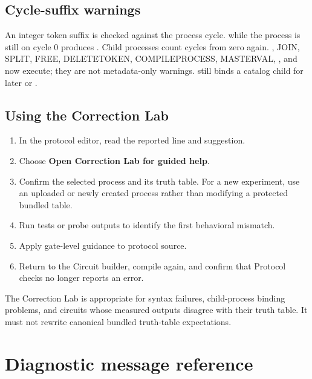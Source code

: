 \subsection{Cycle-suffix warnings}

An integer token suffix is checked against the process cycle.
 while the process is still on cycle 0 produces
. Child processes count cycles from zero again.
, JOIN, SPLIT, FREE, DELETETOKEN, COMPILEPROCESS, MASTERVAL,
, and  now execute; they are not
metadata-only warnings.  still binds a catalog child for
later  or .

\subsection{Using the Correction Lab}

\begin{enumerate}
  \item In the protocol editor, read the reported line and suggestion.
  \item Choose \textbf{Open Correction Lab for guided help}.
  \item Confirm the selected process and its truth table. For a new experiment,
  use an uploaded or newly created process rather than modifying a protected
  bundled table.
  \item Run tests or probe outputs to identify the first behavioral mismatch.
  \item Apply gate-level guidance to protocol source.
  \item Return to the Circuit builder, compile again, and confirm that Protocol
  checks no longer reports an error.
\end{enumerate}

The Correction Lab is appropriate for syntax failures, child-process binding
problems, and circuits whose measured outputs disagree with their truth table.
It must not rewrite canonical bundled truth-table expectations.

\section{Diagnostic message reference}

